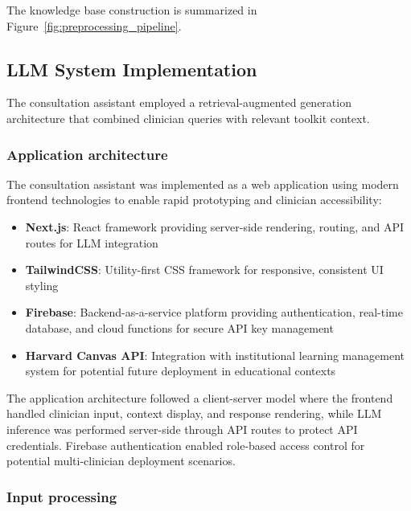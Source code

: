 The knowledge base construction is summarized in Figure~\ref{fig:preprocessing_pipeline}.





\subsection{LLM System Implementation}\label{sec:llm_implementation}

The consultation assistant employed a retrieval-augmented generation architecture that combined clinician queries with relevant toolkit context.

\subsubsection{Application architecture}

The consultation assistant was implemented as a web application using modern frontend technologies to enable rapid prototyping and clinician accessibility:

\begin{itemize}
    \item \textbf{Next.js}: React framework providing server-side rendering, routing, and API routes for LLM integration
    \item \textbf{TailwindCSS}: Utility-first CSS framework for responsive, consistent UI styling
    \item \textbf{Firebase}: Backend-as-a-service platform providing authentication, real-time database, and cloud functions for secure API key management
    \item \textbf{Harvard Canvas API}: Integration with institutional learning management system for potential future deployment in educational contexts
\end{itemize}

The application architecture followed a client-server model where the frontend handled clinician input, context display, and response rendering, while LLM inference was performed server-side through API routes to protect API credentials. Firebase authentication enabled role-based access control for potential multi-clinician deployment scenarios.

\subsubsection{Input processing}

